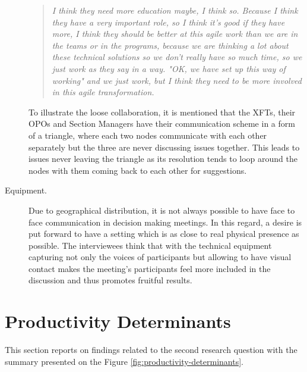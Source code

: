 \begin{description}
   \begin{quote}\itshape
   I think they need more education maybe, I think so. Because I think they have a very important role, so I think it’s good if they have more, I think they should be better at this agile work than we are in the teams or in the programs, because we are thinking a lot about these technical solutions so we don’t really have so much time, so we just work as they say in a way. "OK, we have set up this way of working" and we just work, but I think they need to be more involved in this agile transformation.
   \end{quote}
   
   To illustrate the loose collaboration, it is mentioned that the \acp{XFT}, their \acp{OPO} and Section Managers have their communication scheme in a form of a triangle, where each two nodes communicate with each other separately but the three are never discussing issues together. This leads to issues never leaving the triangle as its resolution tends to loop around the nodes with them coming back to each other for suggestions.


   \item[Equipment.] Due to geographical distribution, it is not always possible to have face to face communication in decision making meetings. In this regard, a desire is put forward to have a setting which is as close to real physical presence as possible. The interviewees think that with the technical equipment capturing not only the voices of participants but allowing to have visual contact makes the meeting's participants feel more included in the discussion and thus promotes fruitful results.


\end{description}

\section{Productivity Determinants}
This section reports on findings related to the second research question with the summary presented on the Figure \ref{fig:productivity-determinants}.

